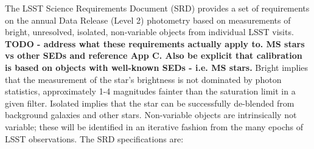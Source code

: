 \documentclass[12pt,preprint]{aastex}
\begin{document}
The LSST Science Requirements Document (SRD) provides a set of
requirements on the annual Data Release (Level 2) photometry based on
measurements of bright, unresolved, isolated, non-variable objects
from individual LSST visits. 
{\bf TODO - address what these requirements actually apply to. MS stars vs other SEDs and reference App C. Also be explicit that calibration is based on objects with well-known SEDs - i.e. MS stars. }
Bright implies that the
measurement of the star's brightness is not dominated by photon
statistics, approximately 1-4 magnitudes fainter than the saturation
limit in a given filter. Isolated implies that the star can be
successfully de-blended from background galaxies and other
stars. Non-variable objects are intrinsically not variable; these will
be identified in an iterative fashion from the many epochs of LSST
observations. The SRD specifications are: 
\end{document}
